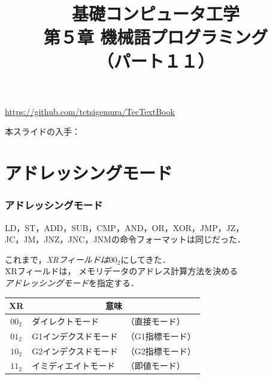 \documentclass[handout]{beamer}        %
\begin{document}
\title{基礎コンピュータ工学\\第５章 機械語プログラミング\\（パート１１）}
\date{}

\begin{frame}
  \titlepage
  \centerline{\url{https://github.com/tctsigemura/TecTextBook}}
  \vfill
  \centerline{本スライドの入手：
    }
\end{frame}


\section{アドレッシングモード}
\begin{frame}
  \frametitle{アドレッシングモード}
  LD，ST，ADD，SUB，CMP，AND，OR，XOR，JMP，JZ，\\
  JC，JM，JNZ，JNC，JNMの命令フォーマットは同じだった．
  \twoByte{\OP}{\GR~\XR}{\A}

  これまで，\emph{XRフィールドは$00_2$}にしてきた．\\
  XRフィールドは，
  メモリデータのアドレス計算方法を決める\\
  \emph{アドレッシングモード}を指定する．\\

  {\small\begin{center}
    \begin{tabular}{c|l l}
      \hline
      \hline
      XR & \multicolumn{2}{|c}{意味} \\
      \hline
      $00_2$ & ダイレクトモード     & （直接モード）   \\
      $01_2$ & G1インデクスドモード & （G1指標モード） \\
      $10_2$ & G2インデクスドモード & （G2指標モード） \\
      $11_2$ & イミディエイトモード & （即値モード）   \\
    \end{tabular}
  \end{center}}
  \vfill
  \vfill
\end{frame}
\end{document}
